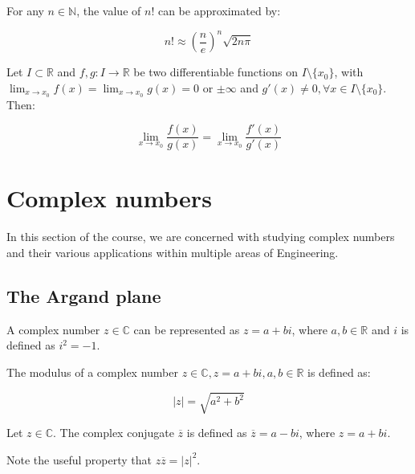 \documentclass[12pt]{article}
\begin{document}
\begin{proposition}
    For any $n \in \mathbb{N}$, the value of $n!$ can be approximated by:

    \[ n! \approx \left(\frac{n}{e}\right)^n\sqrt{2n\pi} \]
\end{proposition}

\begin{theorem}
    Let $I \subset \mathbb{R}$ and $f,g : I \to \mathbb{R}$ be two differentiable functions on $I \setminus \{x_0\}$, with $\lim_{x \to x_0} f(x) = \lim_{x \to x_0} g(x) = 0$ or $\pm \infty$ and $g'(x) \neq 0, \forall x \in I \setminus \{x_0\}$. Then:

    \[ \lim_{x \to x_0} \frac{f(x)}{g(x)} = \lim_{x \to x_0} \frac{f'(x)}{g'(x)} \]
\end{theorem}

\newpage

\section{Complex numbers}

In this section of the course, we are concerned with studying complex numbers and their various applications within multiple areas of Engineering.

\subsection{The Argand plane}

\begin{definition}
    A complex number $z \in \mathbb{C}$ can be represented as $z = a + bi$, where $a, b \in \mathbb{R}$ and $i$ is defined as $i^2 = -1$.
\end{definition}

\begin{definition}
    The modulus of a complex number $z \in \mathbb{C}, z = a + bi, a, b \in \mathbb{R}$ is defined as:

    \[ |z| = \sqrt{a^2 + b^2} \]
\end{definition}

\begin{definition}
    Let $z \in \mathbb{C}$. The complex conjugate $\overline{z}$ is defined as $\overline{z} = a - bi$, where $z = a + bi$.
\end{definition}

Note the useful property that $z\overline{z} = |z|^2$.
\end{document}
